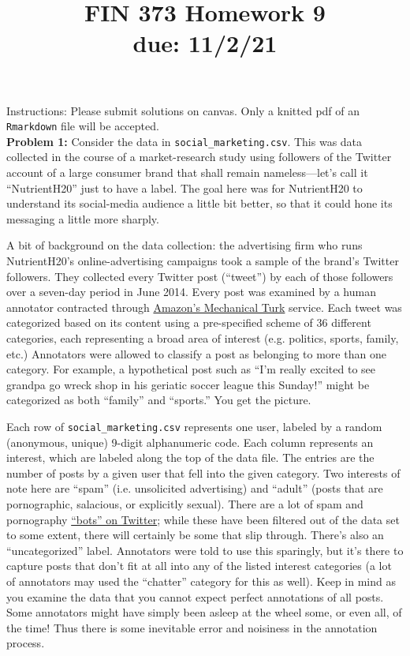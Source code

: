 \documentclass[11pt]{article}
\begin{document}
\title{FIN 373 Homework 9 \\ {\large due: \textbf{11/2/21}}}
\date{}
\maketitle

\vspace{-20mm}

\noindent Instructions: Please submit solutions on canvas.  Only a knitted pdf of an {\tt Rmarkdown} file will be accepted.
\\

\noindent \textbf{Problem 1:} Consider the data in {\tt social_marketing.csv}.  This was data collected in the course of a market-research study using followers of the Twitter account of a large consumer brand that shall remain nameless---let's call it ``NutrientH20'' just to have a label.  The goal here was for NutrientH20 to understand its social-media audience a little bit better, so that it could hone its messaging a little more sharply.

A bit of background on the data collection: the advertising firm who runs NutrientH20's online-advertising campaigns took a sample of the brand's Twitter followers.  They collected every Twitter post (``tweet'') by each of those followers over a seven-day period in June 2014.  Every post was examined by a human annotator contracted through \href{https://www.mturk.com/mturk/welcome}{Amazon's Mechanical Turk} service.  Each tweet was categorized based on its content using a pre-specified scheme of 36 different categories, each representing a broad area of interest (e.g. politics, sports, family, etc.)  Annotators were allowed to classify a post as belonging to more than one category.  For example, a hypothetical post such as ``I'm really excited to see grandpa go wreck shop in his geriatic soccer league this Sunday!'' might be categorized as both ``family'' and ``sports.''  You get the picture.

Each row of {\tt social_marketing.csv} represents one user, labeled by a random (anonymous, unique) 9-digit alphanumeric code.  Each column represents an interest, which are labeled along the top of the data file.  The entries are the number of posts by a given user that fell into the given category.  Two interests of note here are ``spam'' (i.e. unsolicited advertising) and ``adult'' (posts that are pornographic, salacious, or explicitly sexual).  There are a lot of spam and pornography \href{http://mashable.com/2013/11/08/twitter-spambots/}{``bots'' on Twitter}; while these have been filtered out of the data set to some extent, there will certainly be some that slip through.  There's also an ``uncategorized'' label.  Annotators were told to use this sparingly, but it's there to capture posts that don't fit at all into any of the listed interest categories (a lot of annotators may used the ``chatter'' category for this as well).  Keep in mind as you examine the data that you cannot expect perfect annotations of all posts.  Some annotators might have simply been asleep at the wheel some, or even all, of the time!  Thus there is some inevitable error and noisiness in the annotation process.
\end{document}
